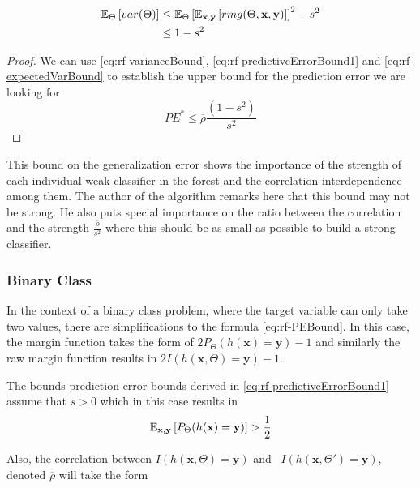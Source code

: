 \begin{equation}\label{eq:rf-expectedVarBound}
\begin{split}
\operatorname{\mathbb{E}}_{\Theta} \left[ var(\Theta) \right]  & \leq \operatorname{\mathbb{E}}_{\Theta} \left[ \operatorname{\mathbb{E}}_{\textbf{x},\textbf{y}}\left[ rmg(\Theta,\textbf{x},\textbf{y})   \right]  \right]^2 -s^2  \\
& \leq 1-s^2
\end{split}
\end{equation}

\begin{proof}
We can use  \ref{eq:rf-varianceBound}, \ref{eq:rf-predictiveErrorBound1} and \ref{eq:rf-expectedVarBound} to establish the upper bound for the prediction error we are looking for
\begin{equation}\label{eq:rf-PEBound}
PE^* \leq \overline{\rho}\frac{(1-s^2)}{s^2}
\end{equation}
\end{proof}

This bound on the generalization error shows the importance of the strength of each individual weak classifier in the forest and the correlation interdependence among them. The author \textcite{breiman-randomforests} of the algorithm remarks here that this bound may not be strong. He also puts special importance on the ratio between the correlation and the strength $\frac{\overline{\rho}}{s^2}$ where this should be as small as possible to build a strong classifier.
\subsubsection{Binary Class}
In the context of a binary class problem, where the target variable can only take two values, there are simplifications to the formula \ref{eq:rf-PEBound}. In this case, the margin function takes the form of $2 P_{\Theta}(h(\textbf{x}) = \textbf{y}) -1$ and similarly the raw margin function results in $2 I(h(\textbf{x}, \Theta) = \textbf{y}) -1$.


The bounds prediction error bounds derived in \ref{eq:rf-predictiveErrorBound1} assume that $s >0$ which in this case results in
\begin{equation}
\operatorname{\mathbb{E}}_{\textbf{x},\textbf{y}} \left[ P_{\Theta}(h(\textbf{x}) = \textbf{y}) \right] > \frac{1}{2}
\end{equation}

Also, the correlation between $I(h(\textbf{x}, \Theta) = \textbf{y})$ and \  $I(h(\textbf{x}, \Theta') = \textbf{y})$, denoted $\overline{\rho}$ will take the form

